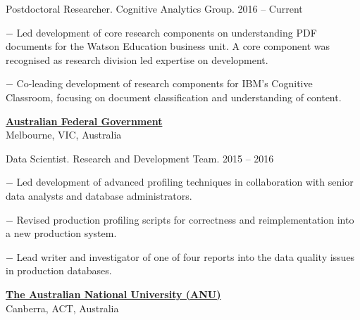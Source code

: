 \documentclass[10pt]{article}
\newcommand{\halfblankline}{\quad\vspace{-0.5\baselineskip}\pagebreak[3]}
\begin{document}
\begin{outerlist}
	\item Postdoctoral Researcher. Cognitive Analytics Group. \hfill {2016 -- Current}
	\begin{innerlist}
		\item[$-$] Led development of core research components on understanding PDF documents for the Watson Education business unit. A core component was recognised as research division led expertise on development.
		\item[$-$] Co-leading development of research components for IBM's Cognitive Classroom, focusing on document classification and understanding of content.
  \end{innerlist}
\end{outerlist}

\halfblankline

\href{http://www.australia.gov.au/}{\textbf{Australian Federal Government}}\\
Melbourne, VIC, Australia

\begin{outerlist}
	\item Data Scientist. Research and Development Team. \hfill {2015 -- 2016}
	\begin{innerlist}
		\item[$-$] Led development of advanced profiling techniques in collaboration with senior data analysts and database administrators.
		\item[$-$] Revised production profiling scripts for correctness and reimplementation into a new production system.
		\item[$-$] Lead writer and investigator of one of four reports into the data quality issues in production databases.
  \end{innerlist}
\end{outerlist}

\halfblankline

\href{http://www.anu.edu.au/}{\textbf{The Australian National University (ANU)}}\\
Canberra, ACT, Australia
\end{document}
